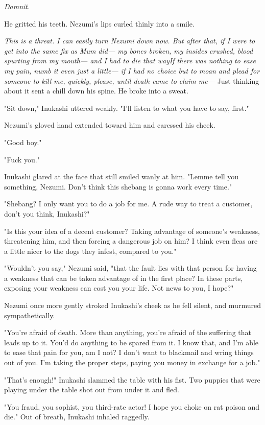 \emph{Damnit.}

He gritted his teeth. Nezumi's lips curled thinly into a smile.

\emph{This is a threat. I can easily turn Nezumi down now. But after that, if
I were to get into the same fix as Mum did--- my bones broken, my insides
crushed, blood spurting from my mouth--- and I had to die that way\el If
there was nothing to ease my pain, numb it even just a little--- if I had
no choice but to moan and plead for someone to kill me, quickly, please,
until death came to claim me---} Just thinking about it sent a chill down
his spine. He broke into a sweat.

"Sit down," Inukashi uttered weakly. "I'll listen to what you have to
say, first."

Nezumi's gloved hand extended toward him and caressed his cheek.

"Good boy."

"Fuck you."

Inukashi glared at the face that still smiled wanly at him. "Lemme tell
you something, Nezumi. Don't think this shebang is gonna work every
time."

"Shebang? I only want you to do a job for me. A rude way to treat a
customer, don't you think, Inukashi?"

"Is this your idea of a decent customer? Taking advantage of someone's
weakness, threatening him, and then forcing a dangerous job on him? I
think even fleas are a little nicer to the dogs they infest, compared to
you."

"Wouldn't you say," Nezumi said, "that the fault lies with that person
for having a weakness that can be taken advantage of in the first place?
In these parts, exposing your weakness can cost you your life. Not news
to you, I hope?"

Nezumi once more gently stroked Inukashi's cheek as he fell silent, and
murmured sympathetically.

"You're afraid of death. More than anything, you're afraid of the
suffering that leads up to it. You'd do anything to be spared from it. I
know that, and I'm able to ease that pain for you, am I not? I don't
want to blackmail and wring things out of you. I'm taking the proper
steps, paying you money in exchange for a job."

"That's enough!" Inukashi slammed the table with his fist. Two puppies
that were playing under the table shot out from under it and fled.

"You fraud, you sophist, you third-rate actor! I hope you choke on rat
poison and die." Out of breath, Inukashi inhaled raggedly.

